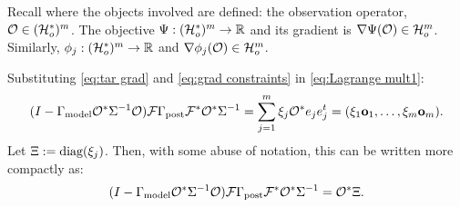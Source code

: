 Recall where the objects involved are defined: the observation
operator, $\mathcal{O} \in (\mathcal{H}_o^*)^m$. The objective $\Psi: (\mathcal{H}_o^*)^m \to
\mathbb{R}$ and its gradient is $\nabla \Psi(\mathcal{O}) \in \mathcal{H}_o^m$. Similarly,
$\phi_j: (\mathcal{H}_o^*)^m \to \mathbb{R}$ and $\nabla \phi_j(\mathcal{O}) \in \mathcal{H}_o^m$.

Substituting \eqref{eq:tar grad} and \eqref{eq:grad constraints} in
\eqref{eq:Lagrange mult1}:
\begin{equation*}
  (I - \modcov \obs^* \Sigma^{-1} \obs) \fwd \postcov \fwd^* \obs^*\Sigma^{-1}
  = \sum_{j=1}^m \xi_j \obs^* e_je_j^t = (\xi_1 \meas_1,\dots,\xi_m \meas_m).
\end{equation*}
Let $\Xi := \textup{diag}(\xi_j)$. Then, with some abuse of notation, this can
be written more compactly as:
\begin{equation}\label{eq:conditions}
  ( I - \modcov \obs^* \Sigma^{-1} \obs) \fwd \postcov \fwd^* \obs^*  \Sigma^{-1}
  = \obs^* \Xi.
\end{equation}





